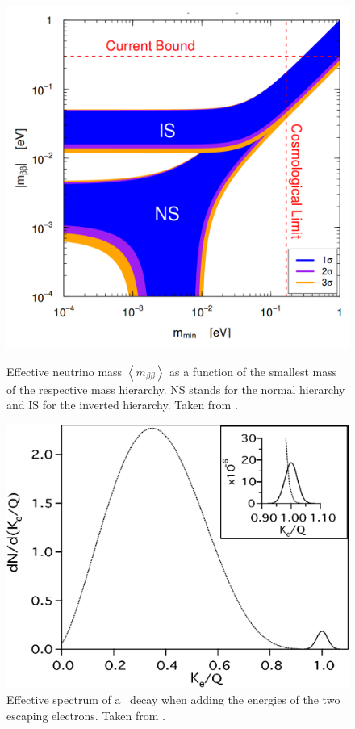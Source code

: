 \documentclass[encoding=utf8,british]{tumphthesis}
\begin{document}
\begin{figure}[t!]
	\centering
	\begin{minipage}[t]{.475\textwidth}
		\centering
		\includegraphics[width=.825\textwidth]{./Bilder/NeutrinoMassOrdering.png}
		\caption{Effective neutrino mass $\left\langle m_{\beta\beta}\right\rangle$ as a function of the smallest mass of the respective mass hierarchy. NS stands for the normal hierarchy and IS for the inverted hierarchy. Taken from \cite{bilenky_neutrinoless_2012}.}
		\label{fig:MassOrder}
	\end{minipage}\hfill%
	\begin{minipage}[t]{.475\textwidth}
		\centering
		\includegraphics[width=\textwidth]{./Bilder/TheoretischesSpektrmdes0nubbDecay.png}
		\caption{Effective spectrum of a \twonu\ decay when adding the energies of the two escaping electrons.  Taken from \cite{elliott_double_2002}.}
		\label{fig:TheoSpektrum}
	\end{minipage}
\end{figure}
\end{document}
